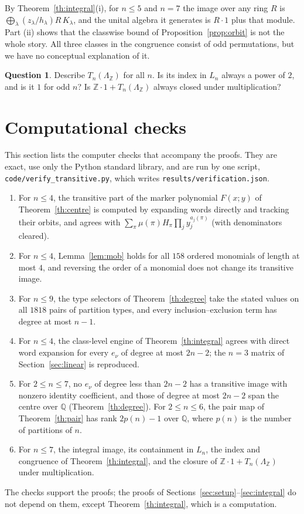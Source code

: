 \documentclass[11pt,a4paper]{article}
\theoremstyle{definition}
\newtheorem{question}[theorem]{Question}
\newcommand{\Z}{\mathbb Z}
\newcommand{\Q}{\mathbb Q}
\begin{document}
By Theorem~\ref{th:integral}(i), for $n\le5$ and $n=7$ the image over any ring $R$ is $\bigoplus_\lambda(z_\lambda/h_\lambda)R\,K_\lambda$, and the unital algebra it generates is $R\cdot1$ plus that module. Part (ii) shows that the classwise bound of Proposition~\ref{prop:orbit} is not the whole story. All three classes in the congruence consist of odd permutations, but we have no conceptual explanation of it.

\begin{question}
Describe $T_n(\Lambda_\Z)$ for all $n$. Is its index in $L_n$ always a power of $2$, and is it $1$ for odd $n$? Is $\Z\cdot1+T_n(\Lambda_\Z)$ always closed under multiplication?
\end{question}

\section{Computational checks}\label{sec:checks}
This section lists the computer checks that accompany the proofs. They are exact, use only the Python standard library, and are run by one script, \texttt{code/verify\_transitive.py}, which writes \texttt{results/verification.json}.
\begin{enumerate}[label=(\alph*)]
\item For $n\le4$, the transitive part of the marker polynomial $F(x;y)$ of Theorem~\ref{th:centre} is computed by expanding words directly and tracking their orbits, and agrees with $\sum_\pi\mu(\pi)H_\pi\prod_jy_j^{a_j(\pi)}$ (with denominators cleared).
\item For $n\le4$, Lemma~\ref{lem:mob} holds for all $158$ ordered monomials of length at most $4$, and reversing the order of a monomial does not change its transitive image.
\item For $n\le9$, the type selectors of Theorem~\ref{th:degree} take the stated values on all $1818$ pairs of partition types, and every inclusion--exclusion term has degree at most $n-1$.
\item For $n\le4$, the class-level engine of Theorem~\ref{th:integral} agrees with direct word expansion for every $e_\nu$ of degree at most $2n-2$; the $n=3$ matrix of Section~\ref{sec:linear} is reproduced.
\item For $2\le n\le7$, no $e_\nu$ of degree less than $2n-2$ has a transitive image with nonzero identity coefficient, and those of degree at most $2n-2$ span the centre over $\Q$ (Theorem~\ref{th:degree}). For $2\le n\le6$, the pair map of Theorem~\ref{th:pair} has rank $2p(n)-1$ over $\Q$, where $p(n)$ is the number of partitions of $n$.
\item For $n\le7$, the integral image, its containment in $L_n$, the index and congruence of Theorem~\ref{th:integral}, and the closure of $\Z\cdot1+T_n(\Lambda_\Z)$ under multiplication.
\end{enumerate}
The checks support the proofs; the proofs of Sections~\ref{sec:setup}--\ref{sec:integral} do not depend on them, except Theorem~\ref{th:integral}, which is a computation.
\end{document}
